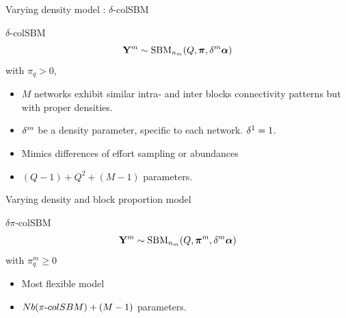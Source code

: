 \documentclass[compress,10pt]{beamer}
\begin{document}
\begin{frame}{Varying density model : $\delta$-colSBM}
 
 
 \begin{block}{ $\delta$-colSBM}
 \begin{equation*}
\mathbf{Y}^m \sim \mbox{SBM}_{n_m}(Q,\boldsymbol{\pi}, \delta^m\boldsymbol{\alpha})
\end{equation*}
with  $\pi_q>0$,
\end{block}

 
 
 \begin{itemize}
  \item $M$ networks 
exhibit similar intra- and inter blocks connectivity patterns but with proper densities. 
\item $\delta^m$ be a  density parameter, specific to each network. $\delta^1 = 1$. 
\item Mimics differences of effort sampling or abundances
\item $(Q - 1)+  Q^2 + (M-1)  $ parameters. 
\end{itemize}
\end{frame}


\begin{frame}{Varying density and block proportion model}

 \begin{block}{$ \delta\pi$-colSBM}
 \begin{equation*}
\mathbf{Y}^m \sim \mbox{SBM}_{n_m}(Q, \boldsymbol{\pi}^m, \delta^m\boldsymbol{\alpha})
\end{equation*}
with  $\pi^m_q\geq0$
 \end{block}

 \begin{itemize}
  \item Most flexible model
\item  $Nb(\pi\text{-} colSBM)  + (M-1)  $ parameters. 
\end{itemize}
\end{frame}
 
\end{document}
